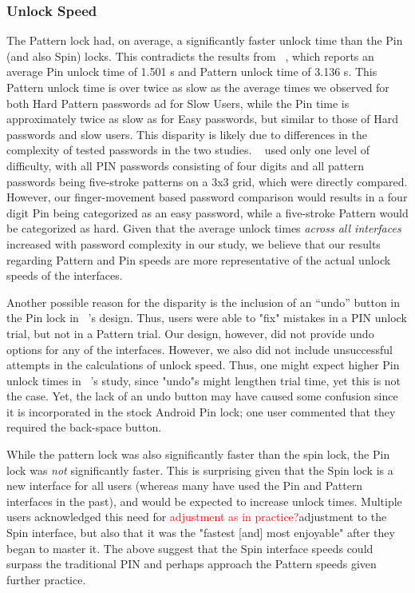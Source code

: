 \documentclass{sigchi}
\newcommand{\comment}[1]{\textcolor{red}{#1}}
\begin{document}
\subsubsection{Unlock Speed}\label{sec:discussion_unlock_speed}

The Pattern lock had, on average, a significantly faster unlock time than the Pin (and also Spin) locks. This contradicts the results from ~\cite{von_zezschwitz_patterns_2013}, which reports an average Pin unlock time of 1.501 s and Pattern unlock time of 3.136 s. This Pattern unlock time is over twice as slow as the average times we observed for both Hard Pattern passwords ad for Slow Users, while the Pin time is approximately twice as slow as for Easy passwords, but similar to those of Hard passwords and slow users. This disparity is likely due to differences in the complexity of tested passwords in the two studies.  ~\cite{von_zezschwitz_patterns_2013} used only one level of difficulty, with all PIN passwords consisting of four digits and all pattern passwords being five-stroke patterns on a 3x3 grid, which were directly compared. However, our finger-movement based password comparison would results in a four digit Pin being categorized as an easy password, while a five-stroke Pattern would be categorized as hard. Given that the average unlock times \textit{across all interfaces} increased with password complexity in our study, we believe that our results regarding Pattern and Pin speeds are more representative of the actual unlock speeds of the interfaces. 

Another possible reason for the disparity is the inclusion of an ``undo'' button in the Pin lock in ~\cite{von_zezschwitz_patterns_2013}'s design. Thus, users were able to "fix" mistakes in a PIN unlock trial, but not in a Pattern trial. Our design, however, did not provide undo options for any of the interfaces. However, we also did not include unsuccessful attempts in the calculations of unlock speed. Thus, one might expect higher Pin unlock times in ~\cite{von_zezschwitz_patterns_2013}'s study, since "undo"s might lengthen trial time, yet this is not the case. Yet, the lack of an undo button may have caused some confusion since it is incorporated in the stock Android Pin lock; one user commented that they required the back-space button. 

While the pattern lock was also significantly faster than the spin lock, the Pin lock was \textit{not} significantly faster. This is surprising given that the Spin lock is a new interface for all users (whereas many have used the Pin and Pattern interfaces in the past), and would be expected to increase unlock times. Multiple users acknowledged this need for \comment{adjustment as in practice?}adjustment to the Spin interface, but also that it was the "fastest [and] most enjoyable" after they began to master it. The above suggest that the Spin interface speeds could surpass the traditional PIN and perhaps approach the Pattern speeds given further practice. 
\end{document}
